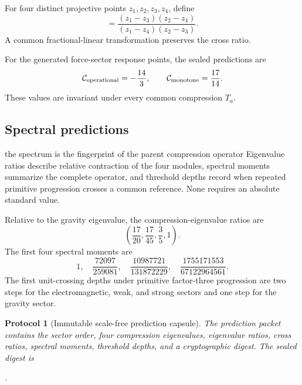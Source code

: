 \documentclass[11pt]{article}
\numberwithin{equation}{section}
\newtheorem{protocol}[definition]{Protocol}
\theoremstyle{remark}
\begin{document}
For four distinct projective points $z_1,z_2,z_3,z_4$, define
\begin{equation}
[z_1,z_2;z_3,z_4]
=\frac{(z_1-z_3)(z_2-z_4)}{(z_1-z_4)(z_2-z_3)}.
\end{equation}
A common fractional-linear transformation preserves the cross ratio.

For the generated force-sector response points, the sealed predictions are
\begin{equation}
\mathcal C_{\rm operational}=-\frac{14}{3},
\qquad
\mathcal C_{\rm monotone}=\frac{17}{14}.
\end{equation}
These values are invariant under every common compression $T_a$.

\subsection{Spectral predictions}
\begin{interpretivebridge}{the spectrum is the fingerprint of the parent compression operator}
Eigenvalue ratios describe relative contraction of the four modules, spectral moments summarize the complete operator, and threshold depths record when repeated primitive progression crosses a common reference. None requires an absolute standard value.
\end{interpretivebridge}

Relative to the gravity eigenvalue, the compression-eigenvalue ratios are
\begin{equation}
\left(\frac{17}{20},\frac{17}{45},\frac35,1\right).
\end{equation}
The first four spectral moments are
\begin{equation}
1,
\quad\frac{72097}{259081},
\quad\frac{10987721}{131872229},
\quad\frac{1755171553}{67122964561}.
\end{equation}
The first unit-crossing depths under primitive factor-three progression are two steps for the electromagnetic, weak, and strong sectors and one step for the gravity sector.

\begin{protocol}[Immutable scale-free prediction capsule]
The prediction packet contains the sector order, four compression eigenvalues, eigenvalue ratios, cross ratios, spectral moments, threshold depths, and a cryptographic digest. The sealed digest is
\begin{center}
.
\end{center}
\end{protocol}
\end{document}
